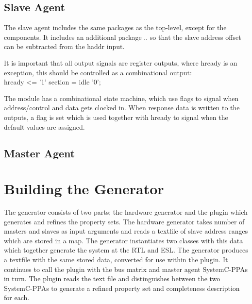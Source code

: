\subsection{Slave Agent}
The slave agent includes the same packages as the top-level, except for the components. It includes an additional package .. so that the slave address offset can be subtracted from the haddr input. \par
It is important that all output signals are register outputs, where hready is an exception, this should be controlled as a combinational output: \\
hready <= '1'  section = idle  '0'; \par
The module has a combinational state machine, which use flags to signal when address/control and data gets clocked in. When response data is written to the outputs, a flag is set which is used together with hready to signal when the default values are assigned.

\subsection{Master Agent}

 

\section{Building the Generator}
The generator consists of two parts; the hardware generator and the plugin which generates and refines the property sets. The hardware generator takes number of masters and slaves as input arguments and reads a textfile of slave address ranges which are stored in a map. The generator instantiates two classes with this data which together generate the system at the RTL and ESL. The generator produces a textfile with the same stored data, converted for use within the plugin. It continues to call the plugin with the bus matrix and master agent SystemC-PPAs in turn. The plugin reads the text file and distinguishes between the two SystemC-PPAs to generate a refined property set and completeness description for each. 


